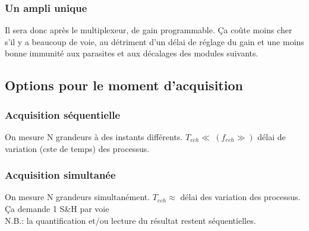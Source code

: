 \subsubsection{Un ampli unique}
Il sera donc après le multiplexeur, de gain programmable. Ça coûte moins cher s'il y a beaucoup de voie, au détriment d'un délai de réglage du gain et une moins bonne immunité aux parasites et aux décalages des modules suivants.
\subsection{Options pour le moment d'acquisition}
\subsubsection{Acquisition séquentielle}
On mesure N grandeurs à des instants différents. \(T_{ech}\ll\ (f_{ech}\gg)\) délai de variation (cste de temps) des processus. 
\subsubsection{Acquisition simultanée}
On mesure N grandeurs simultanément. \(T_{ech}\approx\) délai des variation des processus. Ça demande 1 S\&H par voie\\
N.B.: la quantification et/ou lecture du résultat restent séquentielles.
